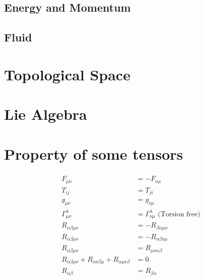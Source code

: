 \documentclass[12pt]{article}
\theoremstyle{mystyle}{\newtheorem{definition}{Definition}[section]}
\theoremstyle{mystyle}{\newtheorem{theorem}[definition]{Theorem}}
\theoremstyle{mystyle}{\newtheorem*{remark}{Remark}}
\theoremstyle{mystyle}{\newtheorem*{example}{Example}}
\theoremstyle{mystyle}{\newtheorem*{examples}{Examples}}
\theoremstyle{cstyle}{\newtheorem*{cthm}{}}
\begin{document}
\subsection{Energy and Momentum}
\subsection{Fluid}


\section{Topological Space}

\section{Lie Algebra}


\section{Property of some tensors}
\begin{align*}
  \begin{split}
    F_{\mu\nu} &= - F_{\nu\mu}\\
    T_{ij} &= T_{ji}\\
    g_{\mu\nu} &= g_{\nu\mu}\\
    \Gamma ^{\lambda}_{\mu\nu} &= \Gamma^{\lambda}_{\nu\mu} \text{ (Torsion free)}\\
    R_{\alpha\beta\mu\nu} &= -R_{\beta\alpha\mu\nu}\\
    R_{\alpha\beta\mu\nu} &= -R_{\alpha\beta\nu\mu}\\
    R_{\alpha\beta\mu\nu} &= R_{\mu\nu\alpha\beta}\\
    R_{\alpha\beta\mu\nu} + R_{\alpha\nu\beta\mu} + R_{\alpha\mu\nu\beta} &= 0 \\
    R_{\alpha\beta} &= R_{\beta\alpha}
  \end{split}
\end{align*}
\end{document}
